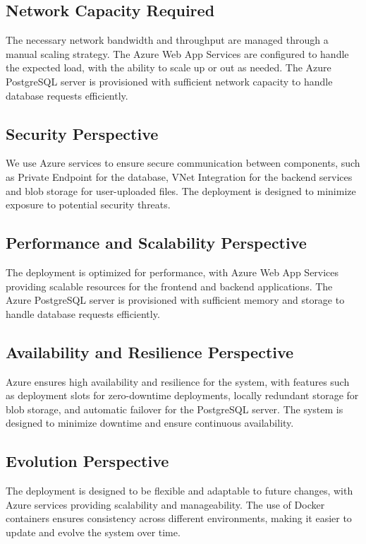 \subsection{Network Capacity Required}
The necessary network bandwidth and throughput are managed through a manual scaling strategy. The Azure Web App Services are configured to handle the expected load, with the ability to scale up or out as needed. The Azure PostgreSQL server is provisioned with sufficient network capacity to handle database requests efficiently.

\subsection{Security Perspective}
We use Azure services to ensure secure communication between components, such as Private Endpoint for the database, VNet Integration for the backend services and blob storage for user-uploaded files. The deployment is designed to minimize exposure to potential security threats.

\subsection{Performance and Scalability Perspective}
The deployment is optimized for performance, with Azure Web App Services providing scalable resources for the frontend and backend applications. The Azure PostgreSQL server is provisioned with sufficient memory and storage to handle database requests efficiently.

\subsection{Availability and Resilience Perspective}
Azure ensures high availability and resilience for the system, with features such as deployment slots for zero-downtime deployments, locally redundant storage for blob storage, and automatic failover for the PostgreSQL server. The system is designed to minimize downtime and ensure continuous availability.

\subsection{Evolution Perspective}
The deployment is designed to be flexible and adaptable to future changes, with Azure services providing scalability and manageability. The use of Docker containers ensures consistency across different environments, making it easier to update and evolve the system over time.

